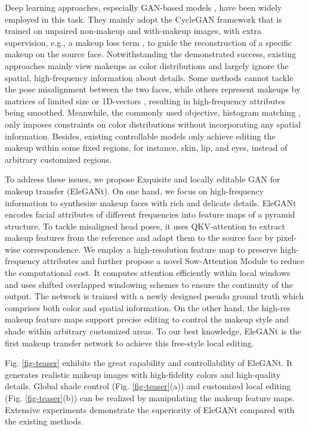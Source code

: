 Deep learning approaches, especially GAN-based models \cite{BeautyGAN,PairedCycleGAN,LADN,PSGAN,SCGAN}, have been widely employed in this task. They mainly adopt the CycleGAN \cite{CycleGAN} framework that is trained on unpaired non-makeup and with-makeup images, with extra supervision, e.g., a makeup loss term \cite{BeautyGAN,PairedCycleGAN,FAT}, to guide the reconstruction of a specific makeup on the source face. 
Notwithstanding the demonstrated success, existing approaches mainly view makeups as color distributions and largely ignore the spatial, high-frequency information about details. Some methods \cite{BeautyGAN,LADN} cannot tackle the pose misalignment between the two faces, while others represent makeups by matrices of limited size \cite{PSGAN} or 1D-vectors \cite{SCGAN}, resulting in high-frequency attributes being smoothed.
Meanwhile, the commonly used objective, histogram matching \cite{BeautyGAN}, only imposes constraints on color distributions without incorporating any spatial information. Besides, existing controllable models \cite{PSGAN,SCGAN} only achieve editing the makeup within some fixed regions, for instance, skin, lip, and eyes, instead of arbitrary customized regions.

To address these issues, we propose Exquisite and locally editable GAN for makeup transfer (EleGANt). On one hand, we focus on high-frequency information to synthesize makeup faces with rich and delicate details.
EleGANt encodes facial attributes of different frequencies into feature maps of a pyramid structure. To tackle misaligned head poses, it uses QKV-attention to extract makeup features from the reference and adapt them to the source face by pixel-wise correspondence. 
We employ a high-resolution feature map to preserve high-frequency attributes and further propose a novel Sow-Attention Module to reduce the computational cost. It computes attention efficiently within local windows and uses shifted overlapped windowing schemes to ensure the continuity of the output. The network is trained with a newly designed pseudo ground truth which comprises both color and spatial information.
On the other hand, the high-res makeup feature maps support precise editing to control the makeup style and shade within arbitrary customized areas. To our best knowledge, EleGANt is the first makeup transfer network to achieve this free-style local editing.

Fig. \ref{fig-teaser} exhibits the great capability and controllability of EleGANt. It generates realistic makeup images with high-fidelity colors and high-quality details. Global shade control (Fig. \ref{fig-teaser}(a)) and customized local editing (Fig. \ref{fig-teaser}(b)) can be realized by manipulating the makeup feature maps. Extensive experiments demonstrate the superiority of EleGANt compared with the existing methods.

